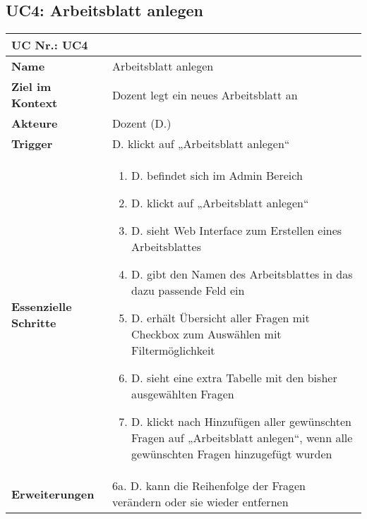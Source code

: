 \begin{table}[h]
\subsection{UC4: Arbeitsblatt anlegen}
	\begin{tabular}{|p{3cm}|p{11.06cm}|}
	\hline
		\multicolumn{2}{|l|}{\textbf{UC Nr.: UC4} }   \\ \hline
		\textbf{Name}                 &     Arbeitsblatt anlegen    \\ \hline
		\textbf{Ziel im Kontext}      &     Dozent legt ein neues Arbeitsblatt an    \\ \hline
		\textbf{Akteure}              &     Dozent (D.)    \\ \hline
		\textbf{Trigger}              &     D. klickt auf „Arbeitsblatt anlegen“    \\ \hline
		\textbf{Essenzielle Schritte} & 
			\begin{enumerate}
			  \item D. befindet sich im Admin Bereich
			  \item D. klickt auf „Arbeitsblatt anlegen“
			  \item D. sieht Web Interface zum Erstellen eines Arbeitsblattes
			  \item D. gibt den Namen des Arbeitsblattes in das dazu passende Feld ein
			  \item D. erhält Übersicht aller Fragen mit Checkbox zum Auswählen mit Filtermöglichkeit
			  \item D. sieht eine extra Tabelle mit den bisher ausgewählten Fragen
			  \item D. klickt nach Hinzufügen aller gewünschten Fragen auf „Arbeitsblatt anlegen“, wenn alle gewünschten Fragen hinzugefügt wurden
			\end{enumerate}
		\\ \hline
		\textbf{Erweiterungen} 		  &   6a. D. kann die Reihenfolge der Fragen verändern oder sie wieder entfernen      \\ \hline
	\end{tabular}
\end{table}\FloatBarrier

